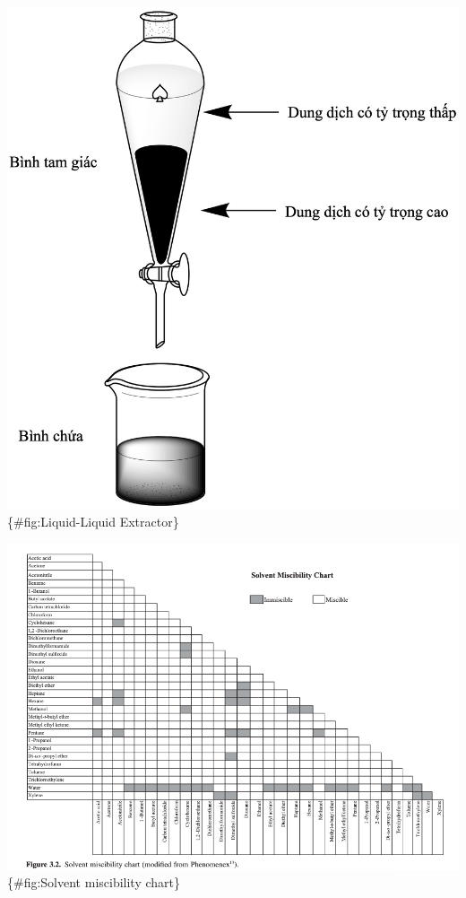 \documentclass[
  letterpaper,
  DIV=11,
  numbers=noendperiod]{scrartcl}
\begin{document}
\includegraphics{../graphics/Liquid-Liquid Extractor.png}\{\#fig:Liquid-Liquid
Extractor\}

\includegraphics{../graphics/Solvent miscibility chart.png}\{\#fig:Solvent
miscibility chart\}
\end{document}
